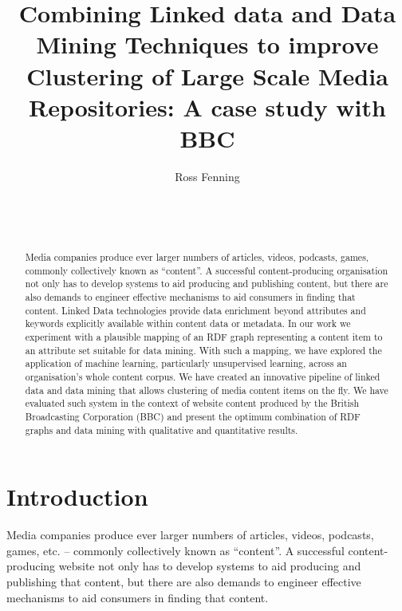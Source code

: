 \documentclass{sig-alternate-05-2015}
\begin{document}
\title{Combining Linked data and Data Mining Techniques to improve Clustering of Large Scale Media Repositories: A case study with BBC}

\author{
\alignauthor
Ross Fenning\\
       \\
       \\
       \\
}

\maketitle
\begin{abstract}
Media companies produce ever larger numbers of articles, videos, podcasts,
games, commonly collectively known as ``content''. A successful
content-producing organisation not only has to develop systems to aid producing
and publishing content, but there are also demands to engineer effective
mechanisms to aid consumers in finding that content. Linked Data technologies
provide data enrichment beyond attributes and keywords explicitly available
within content data or metadata. In our work we experiment with a
plausible mapping of an RDF graph representing a content item to an attribute
set suitable for data mining. With such a mapping, we have explored the
application of machine learning, particularly unsupervised learning, across
an organisation's whole content corpus. We have created an innovative pipeline
of linked data and data mining that allows clustering of media content items on
the fly. We have evaluated such system in the context of website content
produced by the British Broadcasting Corporation (BBC) and present the optimum
combination of RDF graphs and data mining with qualitative and quantitative
results.
\end{abstract}

\section{Introduction}

Media companies produce ever larger numbers of articles, videos, podcasts,
games, etc. -- commonly collectively known as ``content''. A successful
content-producing website not only has to develop systems to aid producing and
publishing that content, but there are also demands to engineer effective
mechanisms to aid consumers in finding that content.
\end{document}
